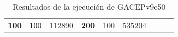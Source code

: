 \begin{table}[H]
\begin{tabular}{|ccrccrccc}
\multicolumn{1}{|c|}{\multirow{-39}{*}{\cellcolor[HTML]{FFFFC7}\textbf{100}}} & \multicolumn{1}{c|}{\multirow{-9}{*}{\cellcolor[HTML]{DDFDFF}100}} & \multicolumn{1}{r|}{\cellcolor[HTML]{DAE8FC}112890}    & \multicolumn{1}{c|}{\multirow{-39}{*}{\cellcolor[HTML]{FFFFC7}\textbf{200}}} & \multicolumn{1}{c|}{\multirow{-10}{*}{\cellcolor[HTML]{DDFDFF}100}} & \multicolumn{1}{r|}{\cellcolor[HTML]{DDFDFF}535204}    &                                                                              &                                                                    &                                                        \\ \cline{1-6}
\end{tabular}
\caption{\label{res:GACEPv9c50}Resultados de la ejecución de GACEPv9c50}
\end{table}

